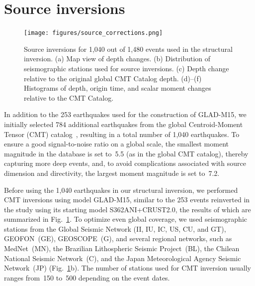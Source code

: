 \documentclass[extra,mreferee]{gji}
\begin{document}
\section{Source inversions}
\label{section:earthquakes}

\begin{figure}
  \centering
  \texttt{[image: figures/source\_corrections.png]}
  \caption{\small{Source inversions for 1,040 out of 1,480 events used in the structural inversion. (a) Map view of depth changes. (b) Distribution of seismographic stations used for source inversions. (c) Depth change relative to the original global CMT Catalog depth. (d)--(f) Histograms of depth, origin time, and scalar moment changes relative to the CMT Catalog.
  }}
  \label{fig:source_correction}
\end{figure}

In addition to the 253 earthquakes used for the construction of GLAD-M15, we initially selected 784 additional earthquakes
from the global Centroid-Moment Tensor (CMT) catalog~\citep[e.g.,][]{ekstrom2012global},
resulting in a total number of 1,040 earthquakes.
To ensure a good signal-to-noise ratio on a global scale,
the smallest moment magnitude in the database is set to~5.5 (as in the global CMT catalog),
thereby capturing more deep events,
and, to avoid complications associated with source dimension and directivity,
the largest moment magnitude is set to~7.2.

Before using the 1,040 earthquakes in our structural inversion,
we performed CMT inversions using model GLAD-M15, similar to the 253 events reinverted in the \citet{bozdaug2016global} study using its starting model S362ANI+CRUST2.0,
the results of which are summarized in Fig.~\ref{fig:source_correction}.
To optimize even global coverage,
we used seismographic stations from the  Global Seismic Network (II, IU, IC, US, CU, and GT),
GEOFON~(GE), GEOSCOPE~(G), and several regional networks, such as MedNet~(MN),
the Brazilian Lithospheric Seismic Project~(BL), the Chilean National Seismic Network~(C),
and the Japan Meteorological Agency Seismic Network~(JP) (Fig.~\ref{fig:source_correction}b).
The number of stations used for CMT inversion usually ranges
from~150 to~500 depending on the event dates.
\end{document}
